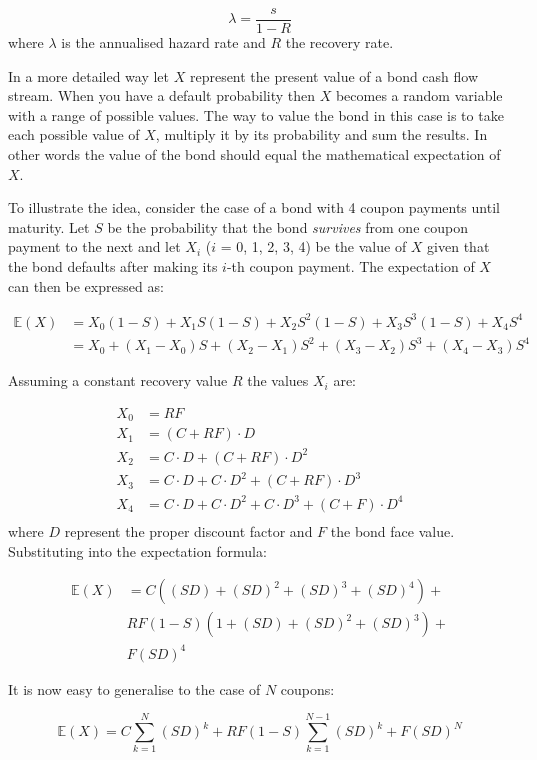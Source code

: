 \[\lambda = \frac{s}{1-R}\]
where $\lambda$ is the annualised hazard rate and $R$ the recovery rate.


In a more detailed way let $X$ represent the present value of a bond cash flow stream. When you
have a default probability then $X$ becomes a random variable with a range
of possible values. The way
to value the bond in this case is to take each possible value of $X$, multiply it
by its probability and sum the results. In other words the value of the bond
should equal the mathematical expectation of $X$.

To illustrate the idea, consider the case of a bond with 4 coupon payments
until maturity. Let $S$ be the probability that the bond \emph{survives} from one
coupon payment to the next and let $X_i$ ($i$ = 0, 1, 2, 3, 4) be the value of
$X$ given that the bond defaults after making its $i$-th coupon payment. 
The expectation of $X$ can then be expressed as:

\begin{align*}
\mathbb{E}(X) &= X_0(1-S) + X_1 S(1-S) + X_2 S^2 (1-S) + X_3 S^3 (1-S) + X_4 S^4 \\
&= X_0 + (X_1 - X_0)S + (X_2 - X_1)S^2 + (X_3 - X_2)S^3 + (X_4 - X_3)S^4
\end{align*}

Assuming a constant recovery value $R$ the values $X_i$ are:

\begin{align*}
X_0 &= RF \\
X_1 &= (C + RF)\cdot D \\
X_2 &= C\cdot D + (C + RF)\cdot D^2 \\
X_3 &= C\cdot D + C\cdot D^2 + (C + RF)\cdot D^3 \\
X_4 &= C\cdot D + C\cdot D^2 + C\cdot D^3 + (C + F)\cdot D^4 \\
\end{align*}
where $D$ represent the proper discount factor and $F$ the bond face value.
Substituting into the expectation formula:

\begin{align*}
\mathbb{E}(X) &= C((SD) + (SD)^2 + (SD)^3 + (SD)^4) + \\
&RF(1-S)(1+(SD)+(SD)^2 + (SD)^3) + \\
&F(SD)^4 
\end{align*}

It is now easy to generalise to the case of $N$ coupons:

\[ \mathbb{E}(X) = C \sum_{k=1}^{N}{(SD)^k} + RF(1-S)\sum_{k=1}^{N-1}{(SD)^k} + F(SD)^N \]

